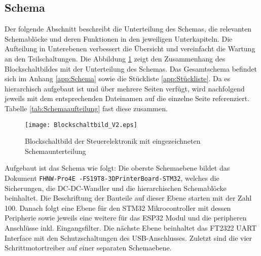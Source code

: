 \subsection{Schema}
\label{sec:Schema}


Der folgende Abschnitt beschreibt die Unterteilung des Schemas, die relevanten Schemablöcke und deren Funktionen in den jeweiligen Unterkapiteln. Die Aufteilung in Unterebenen verbessert die Übersicht und vereinfacht die Wartung an den Teilschaltungen. Die Abbildung \ref{pic:Blockschaltbild_Schema} zeigt den Zusammenhang des Blockschaltbildes mit der Unterteilung des Schemas. Das Gesamtschema befindet sich im Anhang \ref{app:Schema} sowie die Stückliste \ref{app:Stückliste}. Da es hierarchisch aufgebaut ist und über mehrere Seiten verfügt, wird nachfolgend jeweils mit dem entsprechenden Dateinamen auf die einzelne Seite referenziert. Tabelle \ref{tab:Schemaaufteilung} fast diese zusammen.


\begin{figure}[h]
	\centering
	\texttt{[image: Blockschaltbild\_V2.eps]}
	\caption{Blockschaltbild der Steuerelektronik mit eingezeichneten Schemaunterteilung}
	\label{pic:Blockschaltbild_Schema}
\end{figure}

Aufgebaut ist das Schema wie folgt: Die oberste Schemaebene bildet das Dokument \texttt{FHNW-Pro4E -FS19T8-3DPrinterBoard-STM32}, welches die Sicherungen, die DC-DC-Wandler und die hierarchischen Schemablöcke beinhaltet.
Die Beschriftung der Bauteile auf dieser Ebene starten mit der Zahl 100. Danach folgt eine Ebene für den STM32 Mikrocontroller mit dessen Peripherie sowie jeweils eine weitere für das ESP32 Modul und die peripheren Anschlüsse inkl. Eingangsfilter. Die nächste Ebene beinhaltet das FT2322 UART Interface mit den Schutzschaltungen des USB-Anschlusses. Zuletzt sind die vier Schrittmotortreiber auf einer separaten Schemaebene.

